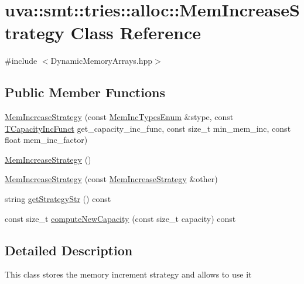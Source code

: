 \hypertarget{classuva_1_1smt_1_1tries_1_1alloc_1_1_mem_increase_strategy}{}\section{uva\+:\+:smt\+:\+:tries\+:\+:alloc\+:\+:Mem\+Increase\+Strategy Class Reference}
\label{classuva_1_1smt_1_1tries_1_1alloc_1_1_mem_increase_strategy}


{\ttfamily \#include $<$Dynamic\+Memory\+Arrays.\+hpp$>$}

\subsection*{Public Member Functions}
\begin{DoxyCompactItemize}
\item 
\hyperlink{classuva_1_1smt_1_1tries_1_1alloc_1_1_mem_increase_strategy_a586918b5019f9bc8d151929593c51280}{Mem\+Increase\+Strategy} (const \hyperlink{namespaceuva_1_1smt_1_1tries_1_1alloc_aa19a45a19458f601785f08cb24e17f16}{Mem\+Inc\+Types\+Enum} \&stype, const \hyperlink{namespaceuva_1_1smt_1_1tries_1_1alloc_a3e6a48b58d6f09d775e523709e041d3c}{T\+Capacity\+Inc\+Funct} get\+\_\+capacity\+\_\+inc\+\_\+func, const size\+\_\+t min\+\_\+mem\+\_\+inc, const float mem\+\_\+inc\+\_\+factor)
\item 
\hyperlink{classuva_1_1smt_1_1tries_1_1alloc_1_1_mem_increase_strategy_aad052afc385e8d24d66937c1aa89bd96}{Mem\+Increase\+Strategy} ()
\item 
\hyperlink{classuva_1_1smt_1_1tries_1_1alloc_1_1_mem_increase_strategy_a1366401f3007e09cde61457e51e8b615}{Mem\+Increase\+Strategy} (const \hyperlink{classuva_1_1smt_1_1tries_1_1alloc_1_1_mem_increase_strategy}{Mem\+Increase\+Strategy} \&other)
\item 
string \hyperlink{classuva_1_1smt_1_1tries_1_1alloc_1_1_mem_increase_strategy_a9b1045c3d9f0fc9d1447f46d8f97b205}{get\+Strategy\+Str} () const 
\item 
const size\+\_\+t \hyperlink{classuva_1_1smt_1_1tries_1_1alloc_1_1_mem_increase_strategy_a9e367e31dc1878b98a41c5fab303c7a5}{compute\+New\+Capacity} (const size\+\_\+t capacity) const 
\end{DoxyCompactItemize}


\subsection{Detailed Description}
This class stores the memory increment strategy and allows to use it 

